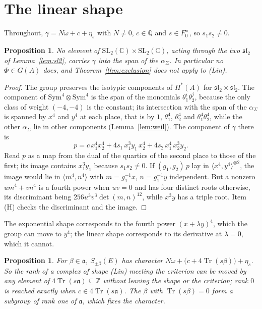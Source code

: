 \documentclass[11pt]{amsart}
\newtheorem{proposition}[theorem]{Proposition}
\theoremstyle{definition}
\theoremstyle{remark}
\newcommand{\QQ}{\mathbb{Q}}
\newcommand{\ZZ}{\mathbb{Z}}
\newcommand{\CC}{\mathbb{C}}
\newcommand{\fa}{\mathfrak{a}}
\newcommand{\Tr}{\operatorname{Tr}}
\newcommand{\SL}{\mathrm{SL}}
\begin{document}
\section{The linear shape}\label{sec:linear}

Throughout, $\gamma=N\omega+c+\eta_{s}$ with $N\neq0$, $c\in\QQ$ and
$s\in F_{0}^{\times}$, so $s_{1}s_{2}\neq0$.

\begin{proposition}\label{prop:nolift}
No element of $\SL_{2}(\CC)\times\SL_{2}(\CC)$, acting through the two
$\mathfrak{sl}_{2}$ of Lemma~\ref{lem:sl2}, carries $\gamma$ into the span of
the $\alpha_{\Sigma}$. In particular no $\Phi\in G(A)$ does, and
Theorem~\ref{thm:exclusion} does not apply to \textup{(Lin)}.
\end{proposition}

\begin{proof}
The group preserves the isotypic components of $H^{*}(A)$ for
$\mathfrak{sl}_{2}\times\mathfrak{sl}_{2}$. The component of
$\mathrm{Sym}^{4}\otimes\mathrm{Sym}^{4}$ is the span of the monomials
$\theta_{1}^{i}\theta_{2}^{j}$, because the only class of weight $(-4,-4)$ is
the constant; its intersection with the span of the $\alpha_{\Sigma}$ is
spanned by $x^{4}$ and $y^{4}$ at each place, that is by $1$,
$\theta_{1}^{4}$, $\theta_{2}^{4}$ and $\theta_{1}^{4}\theta_{2}^{4}$,
while the other $\alpha_{\Sigma}$ lie in other components
(Lemma~\ref{lem:weil}). The component of $\gamma$ there is
\[
  p=c\,x_{1}^{4}x_{2}^{4}+4s_{1}\,x_{1}^{3}y_{1}\,x_{2}^{4}
   +4s_{2}\,x_{1}^{4}\,x_{2}^{3}y_{2}.
\]
Read $p$ as a map from the dual of the quartics of the second place to those
of the first; its image contains $x_{1}^{3}y_{1}$ because $s_{1}s_{2}\neq0$.
If $(g_{1},g_{2})\,p$ lay in $\langle x^{4},y^{4}\rangle^{\otimes2}$, the
image would lie in $\langle m^{4},n^{4}\rangle$ with $m=g_{1}^{-1}x$,
$n=g_{1}^{-1}y$ independent. But a nonzero $um^{4}+vn^{4}$ is a fourth power
when $uv=0$ and has four distinct roots otherwise, its discriminant being
$256u^{3}v^{3}\det(m,n)^{12}$, while $x^{3}y$ has a triple root. Item (H)
checks the discriminant and the image.
\end{proof}

The exponential shape corresponds to the fourth power $(x+\lambda y)^{4}$,
which the group can move to $y^{4}$; the linear shape corresponds to its
derivative at $\lambda=0$, which it cannot.

\begin{proposition}\label{prop:rankshift}
For $\beta\in\fa$, $S_{\pm\beta}(E)$ has character
$N\omega+\bigl(c+4\Tr(s\beta)\bigr)+\eta_{s}$. So the rank of a complex of
shape \textup{(Lin)} meeting the criterion can be moved by any element of
$4\Tr(s\fa)\subseteq\ZZ$ without leaving the shape or the criterion; rank
$0$ is reached exactly when $c\in4\Tr(s\fa)$. The $\beta$ with
$\Tr(s\beta)=0$ form a subgroup of rank one of $\fa$, which fixes the
character.
\end{proposition}
\end{document}

